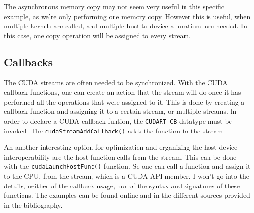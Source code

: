 \documentclass[12pt]{article}
\begin{document}
The asynchronous memory copy may not seem very useful in this specific example,
as we're only performing one memory copy. However this is useful, when multiple kernels are called, and multiple 
host to device allocations are needed. In this case, one copy operation will be assigned to every stream.

\subsection{Callbacks}
The CUDA streams are often needed to be synchronized. With the 
CUDA callback functions, one can create an action that the stream will 
do once it has performed all the operations that were assigned to it.
This is done by creating a callback function and assigning it to a certain 
stream, or multiple streams.
In order to declare a CUDA callback funtion, the \verb|CUDART_CB| 
datatype must be invoked. The \verb|cudaStreamAddCallback()| adds the function
to the stream.

An another interesting option for optimization and organizing the host-device 
interoperability are the host function calls from the stream. This can 
be done with the \verb|cudaLaunchHostFunc()| function. So one can 
call a function and assign it to the CPU, from the stream, which is a 
CUDA API member. I won't go into the details, neither of the callback usage,
nor of the syntax and signatures of these functions.
The examples can be found online and in the different sources provided in 
the bibliography.






%

%
\end{document}
